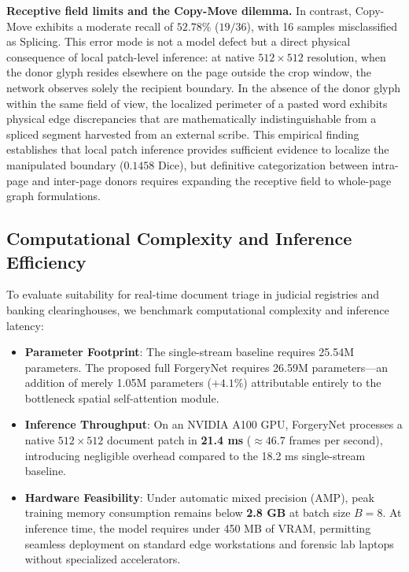 \documentclass[pdflatex,sn-mathphys-num,iicol]{sn-jnl}
\begin{document}
\noindent
\textbf{Receptive field limits and the Copy-Move dilemma.} In contrast, Copy-Move exhibits a moderate recall of $52.78\%$ ($19/36$), with 16 samples misclassified as Splicing. This error mode is not a model defect but a direct physical consequence of local patch-level inference: at native $512 \times 512$ resolution, when the donor glyph resides elsewhere on the page outside the crop window, the network observes solely the recipient boundary. In the absence of the donor glyph within the same field of view, the localized perimeter of a pasted word exhibits physical edge discrepancies that are mathematically indistinguishable from a spliced segment harvested from an external scribe. This empirical finding establishes that local patch inference provides sufficient evidence to localize the manipulated boundary ($0.1458$ Dice), but definitive categorization between intra-page and inter-page donors requires expanding the receptive field to whole-page graph formulations.

\subsection{Computational Complexity and Inference Efficiency}\label{subsec5_5}
To evaluate suitability for real-time document triage in judicial registries and banking clearinghouses, we benchmark computational complexity and inference latency:
\begin{itemize}
    \item \textbf{Parameter Footprint}: The single-stream baseline requires 25.54M parameters. The proposed full ForgeryNet requires 26.59M parameters---an addition of merely 1.05M parameters ($+4.1\%$) attributable entirely to the bottleneck spatial self-attention module.
    \item \textbf{Inference Throughput}: On an NVIDIA A100 GPU, ForgeryNet processes a native $512 \times 512$ document patch in \textbf{21.4 ms} ($\approx 46.7$ frames per second), introducing negligible overhead compared to the 18.2 ms single-stream baseline.
    \item \textbf{Hardware Feasibility}: Under automatic mixed precision (AMP), peak training memory consumption remains below \textbf{2.8 GB} at batch size $B=8$. At inference time, the model requires under 450 MB of VRAM, permitting seamless deployment on standard edge workstations and forensic lab laptops without specialized accelerators.
\end{itemize}
\end{document}
